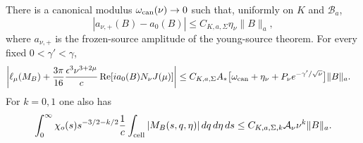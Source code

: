 \begin{proposition}
There is a canonical modulus $\omega_{\rm can}(\nu)\to0$ such that,
uniformly on $K$ and $\mathscr B_a$,
\begin{equation}\label{flat-return:class-amplitude}
 |a_{\nu,+}(B)-a_0(B)|\le C_{K,a,\Sigma}\eta_\nu\|B\|_a,
\end{equation}
where $a_{\nu,+}$ is the frozen-source amplitude of the young-source theorem.
For every fixed $0<\gamma'<\gamma$,
\begin{align*}
 \biggl|\ell_\mu(M_B)
  +\frac{3\pi}{16}\frac{\epsilon^3\nu^{3+2\mu}}c
       \operatorname{Re}[i a_0(B)N_\nu J(\mu)]\biggr|
 \le C_{K,a,\Sigma}A_*\bigl[&\omega_{\rm can}+\eta_\nu
       +P_\nu e^{-\gamma'/\sqrt\nu}\bigr]\|B\|_a.
\end{align*}
For $k=0,1$ one also has
\begin{equation}\label{flat-return:all-moments}
 \int_0^\infty\chi_o(s)s^{-3/2-k/2}\frac1c
       \int_{\rm cell}|M_B(s,q,\eta)|\,dq\,d\eta\,ds
 \le C_{K,a,\Sigma,k}\mathcal A_\nu\nu^k\|B\|_a.
\end{equation}
\end{proposition}
